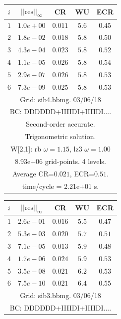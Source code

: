 \begin{table}[hbt]
\begin{center}
{\tablefontsize
\begin{tabular}{|c|c|c|c|c|} \hline 
 $i$   & $\vert\vert\mbox{res}\vert\vert_\infty$  &  CR     &  WU    & ECR  \\   \hline 
 $ 1$  & $ 1.0e+00$ & $0.011$ & $ 5.6$ & $0.45$ \\ 
 $ 2$  & $ 1.8e-02$ & $0.018$ & $ 5.8$ & $0.50$ \\ 
 $ 3$  & $ 4.3e-04$ & $0.023$ & $ 5.8$ & $0.52$ \\ 
 $ 4$  & $ 1.1e-05$ & $0.026$ & $ 5.8$ & $0.54$ \\ 
 $ 5$  & $ 2.9e-07$ & $0.026$ & $ 5.8$ & $0.53$ \\ 
 $ 6$  & $ 7.3e-09$ & $0.025$ & $ 5.8$ & $0.53$ \\ 
\hline 
\multicolumn{5}{|c|}{Grid: sib4.bbmg. 03/06/18}  \\
\multicolumn{5}{|c|}{BC: DDDDDD+IIIIDI+IIIIDI....}  \\
\multicolumn{5}{|c|}{Second-order accurate.}  \\
\multicolumn{5}{|c|}{Trigonometric solution.}  \\
\multicolumn{5}{|c|}{W[2,1]: rb $\omega=1.15$, lz3 $\omega=1.00$}  \\
\multicolumn{5}{|c|}{8.93e+06 grid-points. 4 levels.}  \\
\multicolumn{5}{|c|}{Average CR=$0.021$, ECR=$0.51$.}  \\
\multicolumn{5}{|c|}{time/cycle = 2.21e+01 s.}  \\
\hline 
\end{tabular}
\begin{tabular}{|c|c|c|c|c|} \hline 
 $i$   & $\vert\vert\mbox{res}\vert\vert_\infty$  &  CR     &  WU    & ECR  \\   \hline 
 $ 1$  & $ 2.6e-01$ & $0.016$ & $ 5.5$ & $0.47$ \\ 
 $ 2$  & $ 5.3e-03$ & $0.020$ & $ 5.7$ & $0.51$ \\ 
 $ 3$  & $ 7.1e-05$ & $0.013$ & $ 5.9$ & $0.48$ \\ 
 $ 4$  & $ 1.7e-06$ & $0.024$ & $ 5.9$ & $0.53$ \\ 
 $ 5$  & $ 3.5e-08$ & $0.021$ & $ 6.2$ & $0.53$ \\ 
 $ 6$  & $ 7.5e-10$ & $0.021$ & $ 6.4$ & $0.55$ \\ 
\hline 
\multicolumn{5}{|c|}{Grid: sib3.bbmg. 03/06/18}  \\
\multicolumn{5}{|c|}{BC: DDDDDD+IIIIDI+IIIIDI....}  \\

\end{tabular}}
\end{center}
\end{table}
